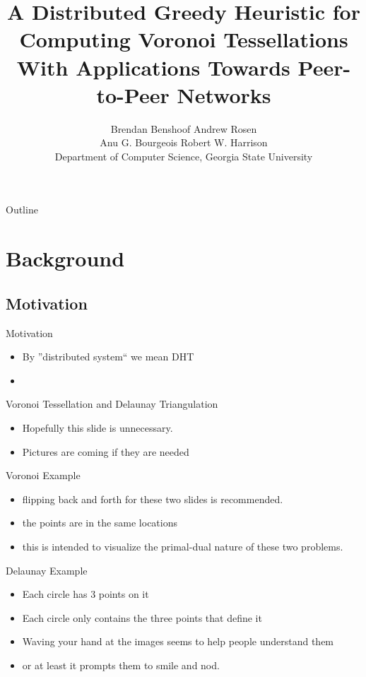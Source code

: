 \documentclass[8pt]{beamer}
\title{A Distributed Greedy Heuristic for Computing Voronoi Tessellations With Applications Towards Peer-to-Peer Networks}
\author{Brendan Benshoof \qquad Andrew Rosen \qquad \\Anu G. Bourgeois \qquad Robert W. Harrison \\Department of Computer Science, Georgia State University}
\begin{document}
	\maketitle
	
	
	
\begin{frame}{Outline}
	\tableofcontents
\end{frame}
	
	
\section{Background}
\subsection{Motivation}
	
	\begin{frame}{Motivation}

		\begin{itemize}
			\item By ''distributed system`` we mean DHT
			\item 
		\end{itemize}

	\end{frame}		
	
	\begin{frame}{Voronoi Tessellation and Delaunay Triangulation}
		\begin{itemize}
			\item Hopefully this slide is unnecessary.
			\item Pictures are coming if they are needed
		\end{itemize}
	\end{frame}
			
			
	\begin{frame}{Voronoi Example}
		\begin{itemize}
			\item flipping back and forth for these two slides is recommended.
			\item the points are in the same locations
			\item this is intended to visualize the primal-dual nature of these two problems.
		\end{itemize}
	\end{frame}

	\begin{frame}{Delaunay Example}
		\begin{itemize}
			\item Each circle has 3 points on it
			\item Each circle only contains the three points that define it
			\item Waving your hand at the images seems to help people understand them
			\item or at least it prompts them to smile and nod.
		\end{itemize}
	\end{frame}
				
\end{document}

